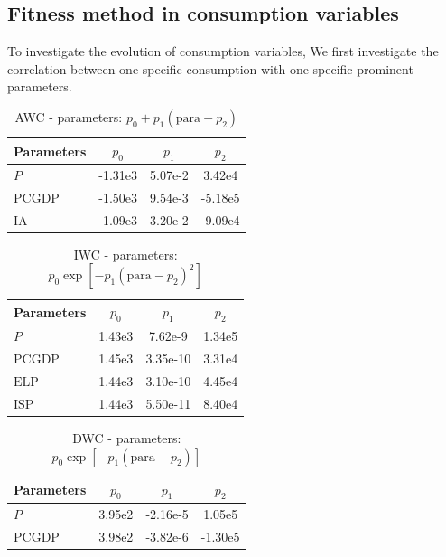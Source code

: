   \subsection{Fitness method in consumption variables}
  To investigate the evolution of consumption variables, We first investigate the correlation between one specific consumption with one specific prominent parameters.

  \begin{table}[!h]

  \centering
  \begin{tabular}{l||c|c|c}
  \hline
  Parameters & $p_0$  &  $p_1$  & $p_2$ \\ \hline
  $P$       &  -1.31e3 & 5.07e-2 & 3.42e4 \\ \hline
  $\text{PCGDP}$ & -1.50e3 &  9.54e-3 & -5.18e5 \\ \hline
  $\text{IA}$   & -1.09e3  &  3.20e-2 & -9.09e4 \\ \hline
  \end{tabular}
  \caption{AWC - parameters: $p_0 +p_1 (\text{para}-p_2)$ }
  \label{tab:AWC - parameters}
  \end{table}

  \begin{table}[!h]

  \centering
  \begin{tabular}{l||c|c|c}
  \hline
  Parameters & $p_0$  &  $p_1$  & $p_2$ \\ \hline
  $P$       &  1.43e3 & 7.62e-9 & 1.34e5 \\ \hline
  $\text{PCGDP}$ & 1.45e3 &  3.35e-10 & 3.31e4 \\ \hline
  $\text{ELP}$   & 1.44e3  &  3.10e-10 & 4.45e4 \\ \hline
  $\text{ISP}$   & 1.44e3  &  5.50e-11 & 8.40e4 \\ \hline

  \end{tabular}
  \caption{IWC - parameters: $p_0\exp{[-p_1 (\text{para}-p_2)^2]}$}
  \label{tab:IWC - parameters}
  \end{table}

  \begin{table}[!h]
  \centering
  \begin{tabular}{l||c|c|c}
  \hline
  Parameters & $p_0$  &  $p_1$  & $p_2$ \\ \hline
  $P$       &  3.95e2 & -2.16e-5 & 1.05e5 \\ \hline
  $\text{PCGDP}$ & 3.98e2 &  -3.82e-6 & -1.30e5 \\ \hline

  \end{tabular}
  \caption{DWC - parameters: $p_0\exp{[-p_1 (\text{para}-p_2)]}$}
  \label{tab:DWC - parameters}
  \end{table}


